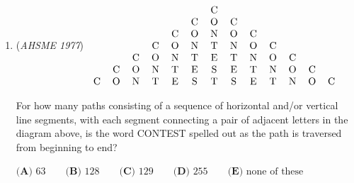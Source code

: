 \begin{enumerate}
 Because $PQRS$ has two pairs of parallel opposite sides, $\boxed{\textbf{(A) }PQRS\text{ is a parallelogram}}$.

 -j314andrews

 



\textbf{Solution 2}

Let $L$, $M$, $N$, and $O$ be the intersections of $AC$ and $PS$, $BD$ and $PQ$, $CA$ and $QR$, and $DB$ and $RS$ respectively. Since the \href{https://artofproblemsolving.com/wiki/index.php?title=Circumcenter}{circumcenter} of a triangle is determined by the intersection of its perpendicular bisectors, each of the pairs mentioned earlier are perpendicular to each other. Let $\angle SPQ=\alpha$. Then $\angle LEM=180^\circ-\alpha$ since $\angle PLC=PMD=90^\circ$. This means $\angle DEC=180^\circ-\alpha$, which similarly implies $\angle QRS=\alpha$. Through a similar method, we find that $\angle PSR=\angle PQR=180^\circ-\alpha$.

 Since the opposite angles of $PQRS$ are congruent, $PQRS$ is indeed a parallelogram - and we showed this without any assumption about the type of quadrilateral $ABCD$ was. Therefore, $PQRS$ is always a parallelogram, and so our answer is $\fbox{A}$. 

 


	\item (\textit{AHSME 1977}) $\begin{tabular}{ccccccccccccc}& & & & & & C & & & & & &\\  & & & & & C & O & C & & & & &\\  & & & & C & O & N & O & C & & & &\\  & & & C & O & N & T & N & O & C & & &\\  & & C & O & N & T & E & T & N & O & C & &\\  & C & O & N & T & E & S & E & T & N & O & C &\\  C & O & N & T & E & S & T & S & E & T & N & O & C \end{tabular}$


 

For how many paths consisting of a sequence of horizontal and/or vertical line segments, with each segment connecting a pair of adjacent letters in the diagram above, is the word CONTEST spelled out as the path is traversed from beginning to end?


 $\textbf{(A) }63\qquad \textbf{(B) }128\qquad \textbf{(C) }129\qquad \textbf{(D) }255\qquad  \textbf{(E) }\text{none of these}$


\end{enumerate}
